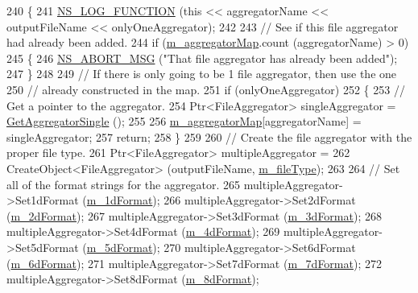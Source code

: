 \begin{DoxyCode}
240 \{
241   \hyperlink{log-macros-disabled_8h_a90b90d5bad1f39cb1b64923ea94c0761}{NS\_LOG\_FUNCTION} (\textcolor{keyword}{this} << aggregatorName << outputFileName << onlyOneAggregator);
242 
243   \textcolor{comment}{// See if this file aggregator had already been added.}
244   \textcolor{keywordflow}{if} (\hyperlink{classns3_1_1FileHelper_a3720f097dd381b699a2b852def0f4168}{m\_aggregatorMap}.count (aggregatorName) > 0)
245     \{
246       \hyperlink{group__fatal_ga51ac4699be799d772ae7258d1ef6af21}{NS\_ABORT\_MSG} (\textcolor{stringliteral}{"That file aggregator has already been added"});
247     \}
248 
249   \textcolor{comment}{// If there is only going to be 1 file aggregator, then use the one}
250   \textcolor{comment}{// already constructed in the map.}
251   \textcolor{keywordflow}{if} (onlyOneAggregator)
252     \{
253       \textcolor{comment}{// Get a pointer to the aggregator.}
254       Ptr<FileAggregator> singleAggregator = \hyperlink{classns3_1_1FileHelper_a13c1e917be6ab94fff56c5262cc080d1}{GetAggregatorSingle} ();
255 
256       \hyperlink{classns3_1_1FileHelper_a3720f097dd381b699a2b852def0f4168}{m\_aggregatorMap}[aggregatorName] = singleAggregator;
257       \textcolor{keywordflow}{return};
258     \}
259 
260   \textcolor{comment}{// Create the file aggregator with the proper file type.}
261   Ptr<FileAggregator> multipleAggregator =
262     CreateObject<FileAggregator> (outputFileName, \hyperlink{classns3_1_1FileHelper_a3bd3c31ac1083d2bee0b0987b0a1323f}{m\_fileType});
263 
264   \textcolor{comment}{// Set all of the format strings for the aggregator.}
265   multipleAggregator->Set1dFormat (\hyperlink{classns3_1_1FileHelper_a9877a5e9438edfec61858113110022e3}{m\_1dFormat});
266   multipleAggregator->Set2dFormat (\hyperlink{classns3_1_1FileHelper_a8723c77fccac8c1464c45a50244af942}{m\_2dFormat});
267   multipleAggregator->Set3dFormat (\hyperlink{classns3_1_1FileHelper_ad1fde05299cc3d892f38844e38cd902f}{m\_3dFormat});
268   multipleAggregator->Set4dFormat (\hyperlink{classns3_1_1FileHelper_aaec049f83d5aeac80beb62b6e3b2816d}{m\_4dFormat});
269   multipleAggregator->Set5dFormat (\hyperlink{classns3_1_1FileHelper_ace51d3b3bb8e63f4f3c24f6571fb6d48}{m\_5dFormat});
270   multipleAggregator->Set6dFormat (\hyperlink{classns3_1_1FileHelper_a1860865352c871c58f975912183da7b7}{m\_6dFormat});
271   multipleAggregator->Set7dFormat (\hyperlink{classns3_1_1FileHelper_aaff51b04dbf06ddc23168385b95569c0}{m\_7dFormat});
272   multipleAggregator->Set8dFormat (\hyperlink{classns3_1_1FileHelper_a66d2e37f20396ac2b698918ef13f865f}{m\_8dFormat});

\end{DoxyCode}
